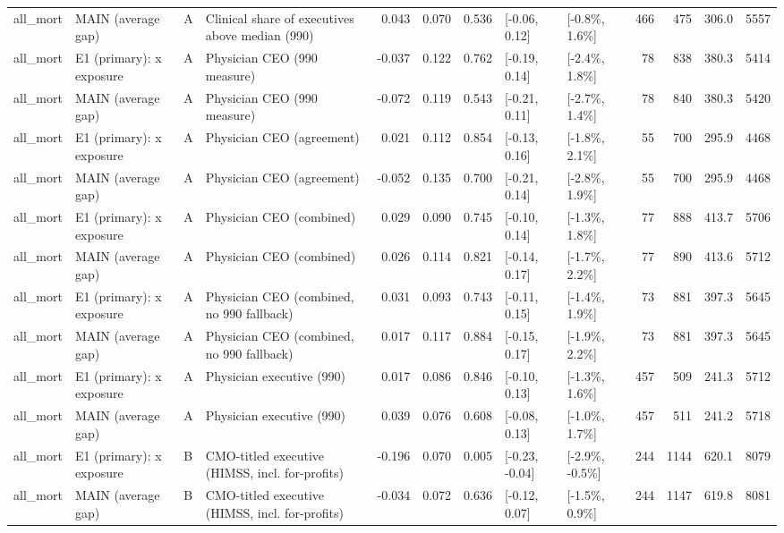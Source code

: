 \begin{tabular}{llllrrrllrrrr}
all\_mort & MAIN (average gap) & A & Clinical share of executives above median (990) & 0.043 & 0.070 & 0.536 & {}[-0.06, 0.12] & {}[-0.8\%, 1.6\%] & 466 & 475 & 306.0 & 5557\\
all\_mort & E1 (primary): x exposure & A & Physician CEO (990 measure) & -0.037 & 0.122 & 0.762 & {}[-0.19, 0.14] & {}[-2.4\%, 1.8\%] & 78 & 838 & 380.3 & 5414\\
all\_mort & MAIN (average gap) & A & Physician CEO (990 measure) & -0.072 & 0.119 & 0.543 & {}[-0.21, 0.11] & {}[-2.7\%, 1.4\%] & 78 & 840 & 380.3 & 5420\\
all\_mort & E1 (primary): x exposure & A & Physician CEO (agreement) & 0.021 & 0.112 & 0.854 & {}[-0.13, 0.16] & {}[-1.8\%, 2.1\%] & 55 & 700 & 295.9 & 4468\\
\addlinespace
all\_mort & MAIN (average gap) & A & Physician CEO (agreement) & -0.052 & 0.135 & 0.700 & {}[-0.21, 0.14] & {}[-2.8\%, 1.9\%] & 55 & 700 & 295.9 & 4468\\
all\_mort & E1 (primary): x exposure & A & Physician CEO (combined) & 0.029 & 0.090 & 0.745 & {}[-0.10, 0.14] & {}[-1.3\%, 1.8\%] & 77 & 888 & 413.7 & 5706\\
all\_mort & MAIN (average gap) & A & Physician CEO (combined) & 0.026 & 0.114 & 0.821 & {}[-0.14, 0.17] & {}[-1.7\%, 2.2\%] & 77 & 890 & 413.6 & 5712\\
all\_mort & E1 (primary): x exposure & A & Physician CEO (combined, no 990 fallback) & 0.031 & 0.093 & 0.743 & {}[-0.11, 0.15] & {}[-1.4\%, 1.9\%] & 73 & 881 & 397.3 & 5645\\
all\_mort & MAIN (average gap) & A & Physician CEO (combined, no 990 fallback) & 0.017 & 0.117 & 0.884 & {}[-0.15, 0.17] & {}[-1.9\%, 2.2\%] & 73 & 881 & 397.3 & 5645\\
\addlinespace
all\_mort & E1 (primary): x exposure & A & Physician executive (990) & 0.017 & 0.086 & 0.846 & {}[-0.10, 0.13] & {}[-1.3\%, 1.6\%] & 457 & 509 & 241.3 & 5712\\
all\_mort & MAIN (average gap) & A & Physician executive (990) & 0.039 & 0.076 & 0.608 & {}[-0.08, 0.13] & {}[-1.0\%, 1.7\%] & 457 & 511 & 241.2 & 5718\\
all\_mort & E1 (primary): x exposure & B & CMO-titled executive (HIMSS, incl. for-profits) & -0.196 & 0.070 & 0.005 & {}[-0.23, -0.04] & {}[-2.9\%, -0.5\%] & 244 & 1144 & 620.1 & 8079\\
all\_mort & MAIN (average gap) & B & CMO-titled executive (HIMSS, incl. for-profits) & -0.034 & 0.072 & 0.636 & {}[-0.12, 0.07] & {}[-1.5\%, 0.9\%] & 244 & 1147 & 619.8 & 8081\\

\end{tabular}
